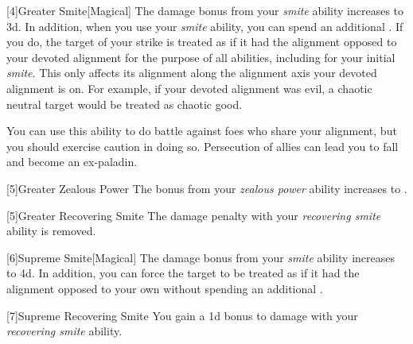         [4]{Greater Smite}[Magical] The damage bonus from your \textit{smite} ability increases to \plus3d.
        In addition, when you use your \textit{smite} ability, you can spend an additional .
        If you do, the target of your strike is treated as if it had the alignment opposed to your devoted alignment for the purpose of all abilities, including for your initial \textit{smite}.
        This only affects its alignment along the alignment axis your devoted alignment is on.
        For example, if your devoted alignment was evil, a chaotic neutral target would be treated as chaotic good.

        You can use this ability to do battle against foes who share your alignment, but you should exercise caution in doing so.
        Persecution of allies can lead you to fall and become an ex-paladin.

        [5]{Greater Zealous Power} The bonus from your \textit{zealous power} ability increases to .

        [5]{Greater Recovering Smite} The damage penalty with your \textit{recovering smite} ability is removed.

        [6]{Supreme Smite}[Magical] The damage bonus from your \textit{smite} ability increases to \plus4d.
        In addition, you can force the target to be treated as if it had the alignment opposed to your own without spending an additional .

        [7]{Supreme Recovering Smite} You gain a \plus1d bonus to damage with your \textit{recovering smite} ability.


